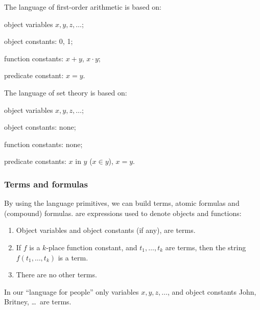 \begin{ex}[]
The language of first-order arithmetic is based on: 

\begin{inparaenum}[(a)]
    \item object variables \(x, y, z, \ldots\);
    \item object constants: 0, 1;
    \item function constants: \(x+y\), \(x\cdot y\);
    \item predicate constant: \(x=y\).
\end{inparaenum}
\end{ex}

\begin{ex}[]
The language of set theory is based on:

\begin{inparaenum}[(a)]
    \item object variables \(x, y, z, \ldots\);
    \item object constants: none;
    \item function constants: none;
    \item predicate constants: \(x\) in \(y\) (\(x\in y\)), \(x=y\).
\end{inparaenum}
\end{ex}

\subsubsection*{Terms and formulas}

By using the language primitives, we can build terms, atomic formulas and (compound) formulas.
 are expressions used to denote objects and functions:

\begin{enumerate}
    \item Object variables and object constants (if any), are terms.
    \item If \(f\) is a \(k\)-place function constant, and \(t_1,\ldots,t_k\) are terms, then the string \(f(t_1,\ldots,t_k)\) is a term.
    \item There are no other terms.
\end{enumerate}

\begin{ex}[]
In our ``language for people'' only variables \(x, y, z, \ldots\), and object constants John, Britney, \ldots\ are terms.
\end{ex}

